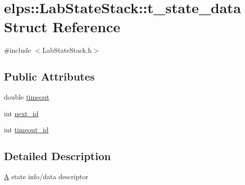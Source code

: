 \hypertarget{structelps_1_1_lab_state_stack_1_1t__state__data}{\section{elps\+:\+:Lab\+State\+Stack\+:\+:t\+\_\+state\+\_\+data Struct Reference}
\label{structelps_1_1_lab_state_stack_1_1t__state__data}
}


{\ttfamily \#include $<$Lab\+State\+Stack.\+h$>$}

\subsection*{Public Attributes}
\begin{DoxyCompactItemize}
\item 
double \hyperlink{structelps_1_1_lab_state_stack_1_1t__state__data_a8e9d1bb6ddfa12335fd73274f0aeae08}{timeout}
\item 
int \hyperlink{structelps_1_1_lab_state_stack_1_1t__state__data_ac4dcaf3ae601cca167790f614b3218d5}{next\+\_\+id}
\item 
int \hyperlink{structelps_1_1_lab_state_stack_1_1t__state__data_ae35e346075e8c9a36439ee0e250495e5}{timeout\+\_\+id}
\end{DoxyCompactItemize}


\subsection{Detailed Description}
\hyperlink{class_a}{A} state info/data descriptor 

